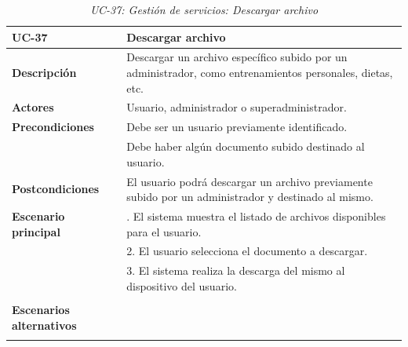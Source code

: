 \begin{table}[H]
  \begin{center}
    \begin{tabularx}{16.4cm}{|l|X|}
      \hline
      \textbf{UC-37} & \textbf{Descargar archivo}\\
      \hline
      \textbf{Descripción} & Descargar un archivo específico subido por un administrador, como entrenamientos personales, dietas, etc. \\
      \hline
      \textbf{Actores} & Usuario, administrador o superadministrador.\\
      \hline
      \textbf{Precondiciones} & Debe ser un usuario previamente identificado.\\
      & Debe haber algún documento subido destinado al usuario.\\
      \hline
      \textbf{Postcondiciones} & El usuario podrá descargar un archivo previamente subido por un administrador y destinado al mismo.\\
      \hline
      \textbf{Escenario principal} & \smallskip 1. El sistema muestra el listado de archivos disponibles para el usuario.\\
      & 2. El usuario selecciona el documento a descargar.\\
      & 3. El sistema realiza la descarga del mismo al dispositivo del usuario.\\
      & \\
      \hline
      \textbf{Escenarios alternativos} & \\
      & \\
      \hline
    \end{tabularx}
    \caption{\textit{UC-37: Gestión de servicios: Descargar archivo}}
    \label{tab:CU-descargar-archivo}
  \end{center}
\end{table}


